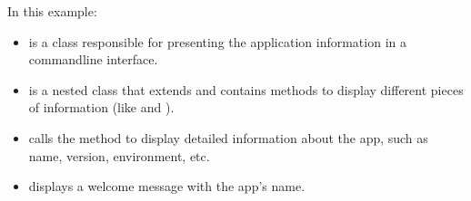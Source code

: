 \documentclass[letterpaper,10pt,english]{sphinxhowto}
\begin{document}
\begin{sphinxVerbatim}[commandchars=\\\{\}]
        
          

      
          

      
          
\end{sphinxVerbatim}

\sphinxAtStartPar
In this example:
\begin{itemize}
\item {} 
\sphinxAtStartPar
{} is a class responsible for presenting the application information in a command\sphinxhyphen{}line interface.

\item {} 
\sphinxAtStartPar
{} is a nested class that extends  and contains methods to display different pieces of information (like  and ).

\item {} 
\sphinxAtStartPar
{} calls the  method to display detailed information about the app, such as name, version, environment, etc.

\item {} 
\sphinxAtStartPar
{} displays a welcome message with the app’s name.

\end{itemize}
\end{document}
